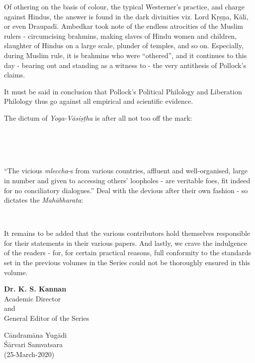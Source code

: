 
Of othering on the basis of colour, the typical Westerner’s practice, and charge against Hindus, the answer is found in the dark divinities viz. Lord Kṛṣṇa, Kālī, or even Draupadī. Ambedkar took note of the endless atrocities of the Muslim rulers - circumcising brahmins, making slaves of Hindu women and children, slaughter of Hindus on a large scale, plunder of temples, and so on. Especially, during Muslim rule, it is brahmins who were “othered”, and it continues to this day - bearing out and standing as a witness to - the very antithesis of Pollock’s claims.

It must be said in conclusion that Pollock’s Political Philology and Liberation Philology thus go against all empirical and scientific evidence.

The dictum of \textit{Yoga-Vāsiṣṭha} is after all not too off the mark:
\begin{center}
 \\\\ \\
\end{center}

“The vicious \textit{mleccha}-s from various countries, affluent and well-organised, large in number and given to accessing others’ loopholes - are veritable foes, fit indeed for no conciliatory dialogues.” Deal with the devious after their own fashion - so dictates the \textit{Mahābharata}:
\begin{center}
\\
\end{center}

It remains to be added that the various contributors hold themselves responsible for their statements in their various papers. And lastly, we crave the indulgence of the readers - for, for certain practical reasons, full conformity to the standards set in the previous volumes in the Series could not be thoroughly ensured in this volume.

\begin{flushright}
\textbf{Dr. K. S. Kannan}\\
Academic Director\\
and\\
General Editor of the Series\\
\end{flushright}

\begin{flushleft}
Cāndramāna Yugādi\\
Śārvari Samvatsara\\
(25-March-2020)
\end{flushleft}
